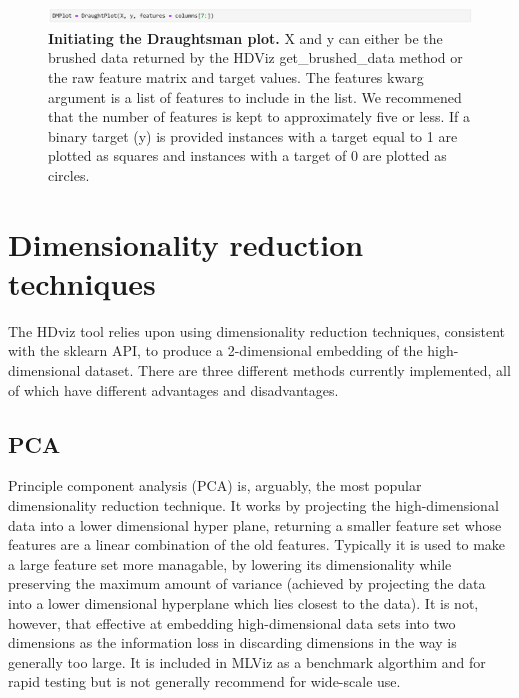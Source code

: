\documentclass[11pt]{article} %
\begin{document}
\begin{figure}
\centering
\includegraphics[width=5.75in]{images/DP_start.png}
\caption{\textbf{Initiating the Draughtsman plot.} X and y can either be the brushed data returned by the HDViz get\_brushed\_data method or the raw feature matrix and target values. The features kwarg argument is a list of features to include in the list. We recommened that the number of features is kept to approximately five or less. If a binary target (y) is provided instances with a target equal to 1 are plotted as squares and instances with a target of 0 are plotted as circles.}
\label{fig:DP_init}
\end{figure}


\clearpage

\appendix

\section{Dimensionality reduction techniques}

The HDviz tool relies upon using dimensionality reduction techniques, consistent with the sklearn API, to produce a 2-dimensional embedding of the high-dimensional dataset. There are three different methods currently implemented, all of which have different advantages and disadvantages.

\subsection{PCA}

Principle component analysis (PCA) is, arguably, the most popular dimensionality reduction technique. It works by projecting the high-dimensional data into a lower dimensional hyper plane, returning a smaller feature set whose features are a linear combination of the old features. Typically it is used to make a large feature set more managable, by lowering its dimensionality while preserving the maximum amount of variance (achieved by projecting the data into a lower dimensional hyperplane which lies closest to the data). It is not, however, that effective at embedding high-dimensional data sets into two dimensions as the information loss in discarding dimensions in the way is generally too large. It is included in MLViz as a benchmark algorthim and for rapid testing but is not generally recommend for wide-scale use.
\end{document}
